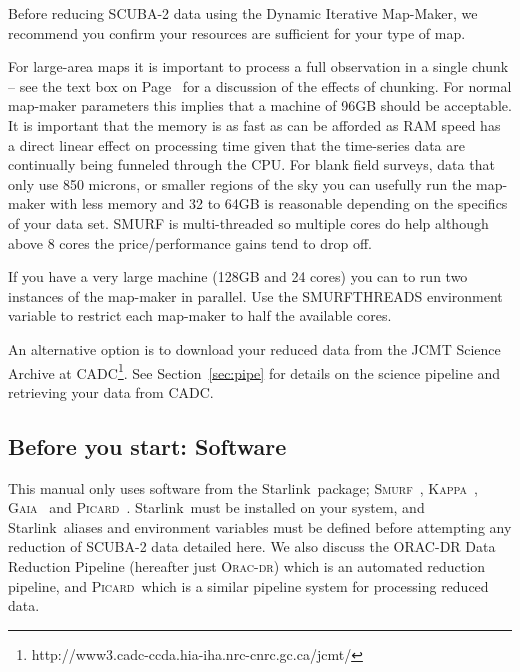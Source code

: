 \documentclass[twoside,11pt]{article}
\newcommand{\htmladdnormallink}[2]{#1}
\newcommand{\xref}[3]{#1}
\newcommand{\xlabel}[1]{}
\renewcommand{\_}{\texttt{\symbol{95}}}
\newcommand{\starlink}{\htmladdnormallink{Starlink}{http://starlink.jach.hawaii.edu}}
\newcommand{\gaia}{\xref{\textsc{Gaia}}{sun214}{}}
\newcommand{\Kappa}{\xref{\textsc{Kappa}}{sun95}{}}
\newcommand{\oracdr}{\htmladdnormallink{\textsc{Orac-dr}}{http://www.oracdr.org/oracdr}}
\newcommand{\picard}{\xref{\textsc{Picard}}{sun265}{}}
\newcommand{\smurf}{\xref{\textsc{Smurf}}{sun258}{}}
\newcommand{\smurfsun}{\xref{\textbf{SUN/258}}{sun258}{}}
\begin{document}
Before reducing SCUBA-2 data using the Dynamic Iterative Map-Maker, we
recommend you confirm your resources are sufficient for your type of
map.

For large-area maps it is important to process a full observation in a
single chunk -- see the text box on Page~\pageref{page:text} for a
discussion of the effects of chunking. For normal map-maker parameters
this implies that a machine of 96GB should be acceptable. It is
important that the memory is as fast as can be afforded as RAM speed
has a direct linear effect on processing time given that the
time-series data are continually being funneled through the CPU.  For
blank field surveys, data that only use 850 microns, or smaller
regions of the sky you can usefully run the map-maker with less memory
and 32 to 64GB is reasonable depending on the specifics of your data
set. SMURF is multi-threaded so multiple cores do help although above
8 cores the price/performance gains tend to drop off.

If you have a very large machine (128GB and 24 cores) you can to run
two instances of the map-maker in parallel. Use the SMURF\_THREADS
environment variable to restrict each map-maker to half the available
cores.

An alternative option is to download your reduced data from the JCMT
Science Archive at
CADC\footnote{http://www3.cadc-ccda.hia-iha.nrc-cnrc.gc.ca/jcmt/}. See
Section~\ref{sec:pipe} for details on the science pipeline and
retrieving your data from CADC.

\subsection{\xlabel{software}Before you start: Software}

This manual only uses software from the \starlink\ package;
\smurf\ \cite{smurf}, \Kappa\ \cite{kappa}, \gaia\ \cite{gaia} and
\picard\ \cite{picard}.
\starlink\ must be installed on your system, and \starlink\ aliases
and environment variables must be defined before attempting any
reduction of SCUBA-2 data detailed here. We also discuss the ORAC-DR
Data Reduction Pipeline\cite{oracdr} (hereafter just \oracdr) which is
an automated reduction pipeline, and \picard\ which is a similar
pipeline system for processing reduced data.


\end{document}
